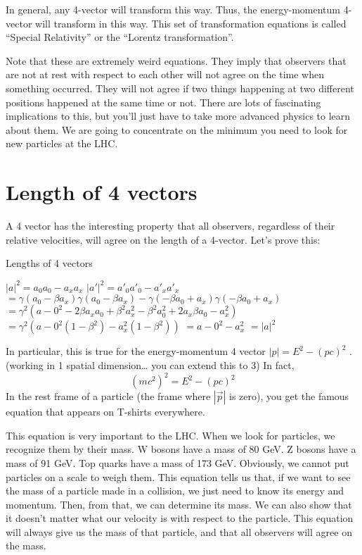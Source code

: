 In general, any 4-vector will transform this way.  Thus, the energy-momentum 4-vector will transform in this way.  This set of transformation equations is called “Special Relativity” or the “Lorentz transformation”.

Note that these are extremely weird equations.  They imply that observers that are not at rest with respect to each other will not agree on the time when something occurred. They will not agree if two things happening at two different positions happened at the same time or not.  There are lots of fascinating implications to this, but you’ll just have to take more advanced physics to learn about them.  We are going to concentrate on the minimum you need to look for new particles at the LHC.

\section{Length of 4 vectors}

A 4 vector has the interesting property that all observers, regardless of their relative velocities, will agree on the length of a 4-vector.  Let’s prove this:

Lengths of 4 vectors

$|a|^2 = a_0 a_0 - a_x a_x  $
$ |a'|^2 = a'_0 a'_0 - a'_x a'_x $ 
$ = \gamma (a_0 -\beta a_x) \gamma (a_0 -\beta a_x) - \gamma (-\beta a_0 +a_x ) \gamma (-\beta a_0 +a_x ) $
$= \gamma^2 (a-0^2  -2 \beta a_x a_0  + \beta^2 a_x^2 - \beta^2 a_0^2  + 2 a_x \beta  a_0  - a_x^2)  $
$=\gamma^2 ( a-0^2 (1-  \beta^2)  - a_x^2 (1-  \beta^2)) $ 
$= a-0^2 - a_x^2  $
$= |a|^2  $
 

In particular, this is true for the energy-momentum 4 vector  $|p| = E^2 - (pc)^2$  . (working in 1 spatial dimension… you can extend this to 3)  In fact, 
\begin{equation}
	  	(mc^2)^2 = E^2 -(pc)^2
\end{equation}  
In the rest frame of a particle (the frame where  $|\vec p |$  is zero), you get the famous equation that appears on T-shirts everywhere.

This equation is very important to the LHC.  When we look for particles, we recognize them by their mass.  W bosons have a mass of 80 GeV.  Z bosons have a mass of 91 GeV.  Top quarks have a mass of 173 GeV.  Obviously, we cannot put particles on a scale to weigh them. This equation tells us that, if we want to see the mass of a particle made in a collision, we just need to know its energy and momentum.  Then, from that, we can determine its mass.  We can also show that it doesn’t matter what our velocity is with respect to the particle.  This equation will always give us the mass of that particle, and that all observers will agree on the mass.


